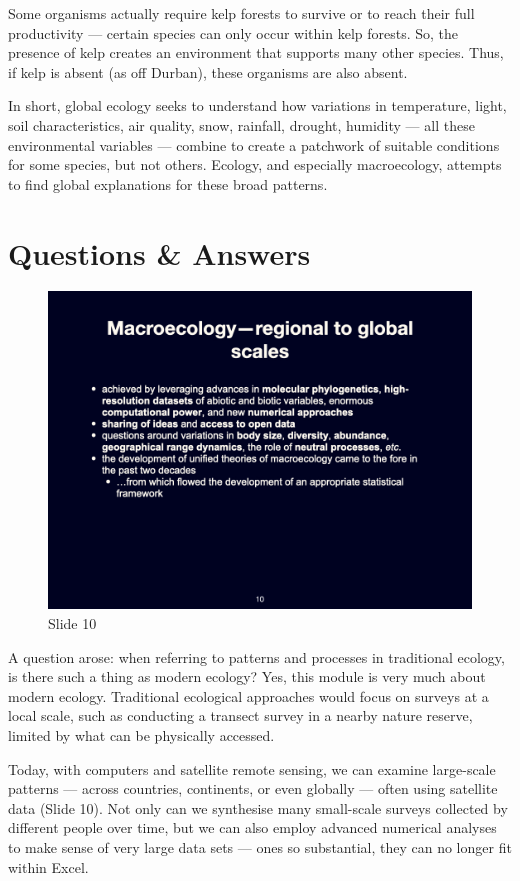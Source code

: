 \documentclass[
  10pt,
]{book}
\begin{document}
Some organisms actually require kelp forests to survive or to reach
their full productivity --- certain species can only occur within kelp
forests. So, the presence of kelp creates an environment that supports
many other species. Thus, if kelp is absent (as off Durban), these
organisms are also absent.

In short, global ecology seeks to understand how variations in
temperature, light, soil characteristics, air quality, snow, rainfall,
drought, humidity --- all these environmental variables --- combine to
create a patchwork of suitable conditions for some species, but not
others. Ecology, and especially macroecology, attempts to find global
explanations for these broad patterns.

\section{Questions \& Answers}\label{questions-answers-1}

\begin{figure}[ht]
\centering
\includegraphics[width=0.8\linewidth]{../images/BDC334/BDC334-010.jpeg}
\caption*{Slide 10}
\end{figure}

A question arose: when referring to patterns and processes in
traditional ecology, is there such a thing as modern ecology? Yes, this
module is very much about modern ecology. Traditional ecological
approaches would focus on surveys at a local scale, such as conducting a
transect survey in a nearby nature reserve, limited by what can be
physically accessed.

Today, with computers and satellite remote sensing, we can examine
large-scale patterns --- across countries, continents, or even globally
--- often using satellite data (Slide 10). Not only can we synthesise
many small-scale surveys collected by different people over time, but we
can also employ advanced numerical analyses to make sense of very large
data sets --- ones so substantial, they can no longer fit within Excel.
\end{document}
